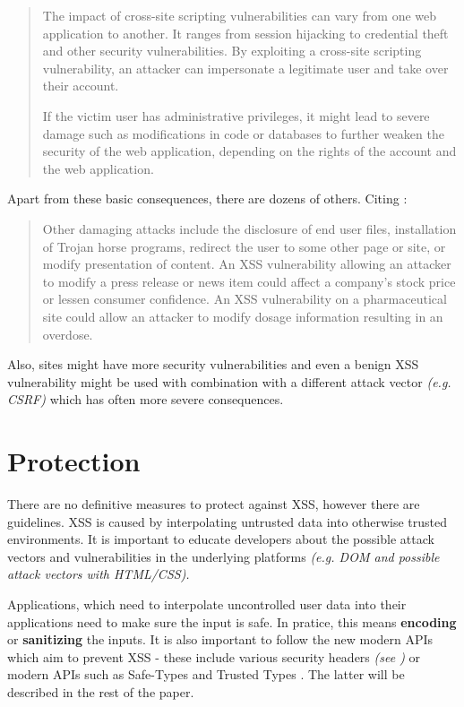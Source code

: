 \begin{quotation}
  The impact of cross-site scripting vulnerabilities can vary from one web application to another.
  It ranges from session hijacking to credential theft and other security vulnerabilities. By
  exploiting a cross-site scripting vulnerability, an attacker can impersonate a legitimate user and
  take over their account.

  If the victim user has administrative privileges, it might lead to severe damage such as
  modifications in code or databases to further weaken the security of the web application,
  depending on the rights of the account and the web application.
\end{quotation}

Apart from these basic consequences, there are dozens of others. Citing \cite{xss_owasp_intro}:

\begin{quotation}
  Other damaging attacks include the disclosure of end user files, installation of Trojan horse
  programs, redirect the user to some other page or site, or modify presentation of content. An XSS
  vulnerability allowing an attacker to modify a press release or news item could affect a company’s
  stock price or lessen consumer confidence. An XSS vulnerability on a pharmaceutical site could
  allow an attacker to modify dosage information resulting in an overdose.
\end{quotation}

Also, sites might have more security vulnerabilities and even a benign XSS vulnerability might be
used with combination with a different attack vector \emph{(e.g. CSRF)} which has often more severe
consequences.

\section{Protection}

There are no definitive measures to protect against XSS, however there are guidelines. XSS is caused
by interpolating untrusted data into otherwise trusted environments. It is important to educate
developers about the possible attack vectors and vulnerabilities in the underlying platforms
\emph{(e.g. DOM and possible attack vectors with HTML/CSS).}

Applications, which need to interpolate uncontrolled user data into their applications need to make
sure the input is safe. In pratice, this means \textbf{encoding} or \textbf{sanitizing} the inputs.
It is also important to follow the new modern APIs which aim to prevent XSS - these include various
security headers \emph{(see \cite{cypress_xss_consequences})} or modern APIs such as Safe-Types
\cite{safe_types} and Trusted Types \cite{trusted_types_into}. The latter will be described in the
rest of the paper.
